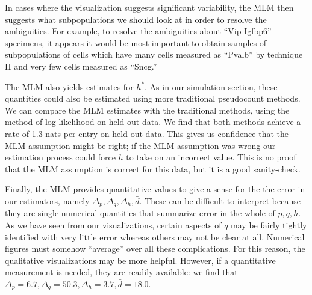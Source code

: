 In cases where the visualization suggests significant variability, the MLM then suggests what subpopulations we should look at in order to resolve the ambiguities.  For example, to resolve the ambiguities about ``Vip Igfbp6'' specimens, it appears it would be most important to obtain samples of subpopulations of cells which have many cells measured as ``Pvalb'' by technique II and very few cells measured as ``Sncg.''  


The MLM also yields estimates for $h^*$.  As in our simulation section, these quantities could also be estimated using more traditional pseudocount methods.  We can compare the MLM estimates with the traditional methods, using the method of log-likelihood on held-out data.  We find that both methods achieve a rate of 1.3 nats per entry on held out data.  This gives us confidence that the MLM assumption might be right; if the MLM assumption was wrong our estimation process could force $h$ to take on an incorrect value.   This is no proof that the MLM assumption is correct for this data, but it is a good sanity-check.  

Finally, the MLM provides quantitative values to give a sense for the the error in our estimators, namely $\Delta_p,\Delta_q,\Delta_h,\bar d$.  These can be difficult to interpret because they are single numerical quantities that summarize error in the whole of $p,q,h$.  As we have seen from our visualizations, certain aspects of $q$ may be fairly tightly identified with very little error whereas others may not be clear at all.  Numerical figures must somehow ``average'' over all these complications.  For this reason, the qualitative visualizations may be more helpful.  However, if a quantitative measurement is needed, they are readily available: we find that $\Delta_p=6.7,\Delta_q=50.3,\Delta_h=3.7,\bar d=18.0$.  

